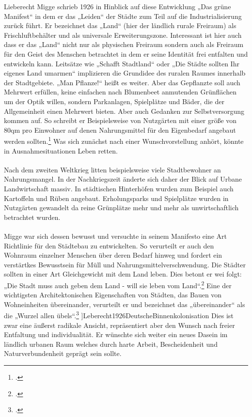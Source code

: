 \documentclass{scrartcl}
\begin{document}
Lieberecht Migge schrieb 1926 in Hinblick auf diese Entwicklung „Das grüne Manifest“ in dem er das „Leiden“ der Städte zum Teil auf die Industrialisierung zurück führt. Er bezeichnet das „Land“ (hier der ländlich rurale Freiraum) als Frischluftbehälter und als universale Erweiterungszone. Interessant ist hier auch dass er das „Land“ nicht nur als physischen Freiraum sondern auch als Freiraum für den Geist des Menschen betrachtet in dem er seine Identität frei entfalten und entwickeln kann. Leitsätze wie „Schafft Stadtland“ oder „Die Städte sollten Ihr eigenes Land umarmen“ implizieren die Grundidee des ruralen Raumes innerhalb der Stadtgebiete. „Man Pflanze!“ heißt es weiter. Aber das Gepflanzte soll auch Mehrwert erfüllen, keine einfachen nach Blumenbeet anmutenden Grünflächen um der Optik willen, sondern Parkanlagen, Spielplätze und Bäder, die der Allgemeinheit einen Mehrwert bieten. Aber auch Gedanken zur Selbstversorgung kommen auf. So schreibt er Beispielsweise von Nutzgärten mit einer größe von 80qm pro Einwohner auf denen Nahrungsmittel für den Eigenbedarf angebaut werden sollten.\footcite[Vgl.][S. 7-15]{Leberecht1926DeutscheBinnenkolonisation} Was sich zunächst nach einer Wunschvorstellung anhört, könnte in Ausnahmesituationen Leben retten.\\
\\
Nach dem zweiten Weltkrieg litten beispielsweise viele Stadtbewohner an Nahrungsmangel. In der Nachkriegszeit änderte sich daher der Blick auf Urbane Landwirtschaft massiv. In städtischen Hinterhöfen wurden zum Beispiel auch Kartoffeln und Rüben angebaut. Erholungsparks und Spielplätze wurden in Nutzgärten gewandelt da reine Grünplätze mehr und mehr als unwirtschaftlich betrachtet wurden. \\
\\
Migge war sich dessen bewusst und versuchte in seinem Manifesto eine Art Richtlinie für den Städtebau zu entwickelten. So verurteilt er auch den Wohnraum einzelner Menschen über deren Bedarf hinweg und fordert ein verstärtkes Bewusstsein für Müll und Nahrungsmittelverschwendung. Die Städter sollten in einer Art Gleichgewicht mit dem Land leben. Dies betont er wei folgt: „Die Stadt muss auch geben dem Land - will sie leben vom Land“.\footcite[S. 10]{Leberecht1926DeutscheBinnenkolonisation} Eine der wichtigsten Architektonischen Eigenschaften von Städten, das Bauen von Wohneinheiten übereinander, verurteilt er und bezeichnet das „übereinander“ als die „Wurzel allen übels“.\footcite[S. 13]{Leberecht1926DeutscheBinnenkolonisation} ]{Leberecht1926DeutscheBinnenkolonisation} Dies ist zwar eine äußerst radikale Ansicht, repräsentiert aber den Wunsch nach freier Entfaltung und individualität. Er wünschte sich weiter ein neues Dasein im ländlich urbanen Raum welches durch harte Arbeit, Bescheidenheit und Naturverbundenheit geprägt sein sollte.
\end{document}
